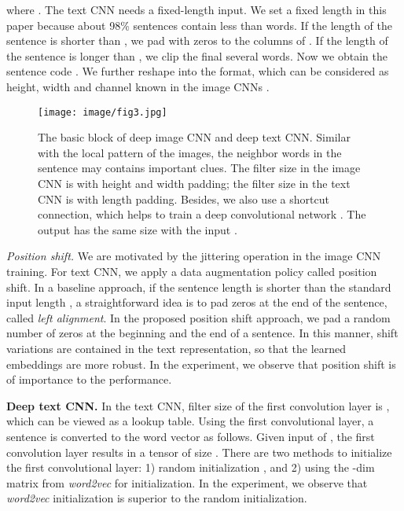 \documentclass[10pt,final,journal]{IEEEtran}
\begin{document}
where . The text CNN needs a fixed-length input. We set a fixed length  in this paper because about 98\% sentences contain less than  words. If the length of the sentence is shorter than , we pad with zeros to the columns of . If the length of the sentence is longer than , we clip the final several words. Now we obtain the  sentence code . We further reshape  into the  format, which can be considered as height, width and channel known in the image CNNs \cite{he2016deep,krizhevsky2012imagenet}.

\begin{figure}[t]
\begin{center}
\texttt{[image: image/fig3.jpg]}
\end{center}
   \caption{The basic block of deep image CNN and deep text CNN. Similar with the local pattern of the images, the neighbor words in the sentence may contains important clues. The filter size in the image CNN is  with height and width padding; the filter size in the text CNN is  with length padding. Besides, we also use a shortcut connection, which helps to train a deep convolutional network \cite{he2016deep}. The output  has the same size with the input .}
\label{fig:3}
\end{figure}

\emph{Position shift.}
We are motivated by the jittering operation in the image CNN training. For text CNN, we apply a data augmentation policy called position shift. In a baseline approach, if the sentence length  is shorter than the standard input length , a straightforward idea is to pad zeros at the end of the sentence, called \emph{left alignment}. In the proposed position shift approach, we pad a random number of zeros at the beginning and the end of a sentence. In this manner, shift variations are contained in the text representation, so that the learned embeddings are more robust. In the experiment, we observe that position shift is of importance to the performance. 

\textbf{Deep text CNN.} In the text CNN, filter size of the first convolution layer is , which can be viewed as a lookup table. Using the first convolutional layer, a sentence is converted to the word vector as follows. Given input  of , the first convolution layer results in a tensor of size . There are two methods to initialize the first convolutional layer: 1) random initialization \cite{glorot2010understanding}, and 2) using the -dim matrix from \emph{word2vec} for initialization. In the experiment, we observe that \emph{word2vec} initialization is superior to the random initialization.
\end{document}
